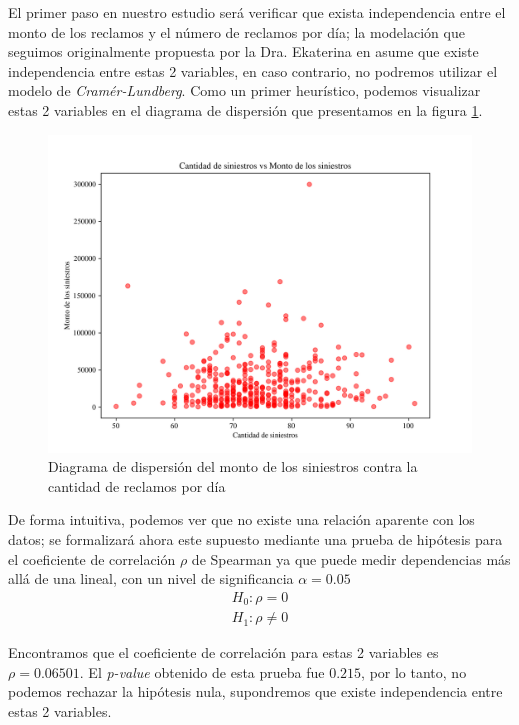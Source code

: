 \documentclass[journal]{IEEEtran}
\begin{document}
                El primer paso en nuestro estudio será verificar que exista independencia entre el monto de los reclamos y el número de reclamos por día; la modelación que seguimos originalmente propuesta por la Dra. Ekaterina en \cite{ekaterina} asume que existe independencia entre estas 2 variables, en caso contrario, no podremos utilizar el modelo de \emph{Cramér-Lundberg}. Como un primer heurístico, podemos visualizar estas 2 variables en el diagrama de dispersión que presentamos en la figura \ref{img:scatter-independence}.
                \begin{figure}[!htbp]
                    \centering
                    \includegraphics[scale=0.4]{img/independent.png}
                    \caption{Diagrama de dispersión del monto de los siniestros contra la cantidad de reclamos por día}
                    \label{img:scatter-independence}
                \end{figure}

                De forma intuitiva, podemos ver que no existe una relación aparente con los datos; se formalizará ahora este supuesto mediante una prueba de hipótesis para el coeficiente de correlación $\rho$ de Spearman ya que puede medir dependencias más allá de una lineal, con un nivel de significancia $\alpha = 0.05$
                \begin{gather*}
                    H_0: \rho = 0 \\
                    H_1: \rho \neq 0
                \end{gather*}

                Encontramos que el coeficiente de correlación para estas 2 variables es $\rho = 0.06501$. El \textit{p-value} obtenido de esta prueba fue $0.215$, por lo tanto, no podemos rechazar la hipótesis nula, supondremos que existe independencia entre estas 2 variables.
            
\end{document}
